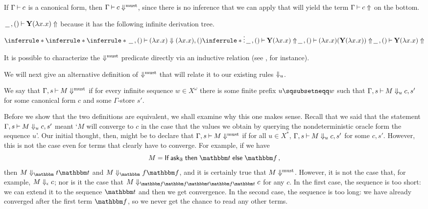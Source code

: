 \begin{example}
  If $\Gamma\mathbin{\vdash} c$ is a canonical form, then $\Gamma\mathbin{\vdash} c\Downarrow^{\text{must}}$, since there is no inference that we can apply that will yield the term $\Gamma\mathbin{\vdash} c\Uparrow$ on the bottom.
\end{example}

\begin{example}
  $\,\underline{\hspace{1.5ex}}\,,()\mathbin{\vdash} \mathbf{Y}(\lambda x.x)\Uparrow$ because it has the following infinite derivation tree.
  \[
    \inferrule*
    {
      \inferrule*
      {
        \inferrule*
        {
        }
        {
          \blank,()\ts (\lambda x.x) \converges (\lambda x.x),()
        }
        \\
        \inferrule*
        {
          \vdots
        }
        {
          \blank,() \ts \Y(\lambda x.x)\diverges
        }
      }
      {
        \blank,()\ts (\lambda x.x)(\Y(\lambda x.x)) \diverges
      }
    }
    {
      \blank,()\ts \Y(\lambda x.x)\diverges
    }
    \]
\end{example}

\begin{remark}
It is possible to characterize the $\Downarrow^{\text{must}}$ predicate directly via an inductive relation (see \cite{RusssThesis}, for instance).  
\end{remark}

We will next give an alternative definition of $\Downarrow^{\text{must}}$ that will relate it to our existing rules $\Downarrow_u$.

\begin{definition}
  We say that $\Gamma,s\mathbin{\vdash} M\Downarrow^{\text{must}}$ if for every infinite sequence $w\in X^\omega$ there is some finite prefix $u\pprefix w$ such that $\Gamma,s\mathbin{\vdash} M\Downarrow_u c,s'$ for some canonical form $c$ and some $\Gamma$-store $s'$.
  \label{DefMustConvergence}
\end{definition}

Before we show that the two definitions are equivalent, we shall examine why this one makes sense.  
Recall that we said that the statement $\Gamma,s\mathbin{\vdash} M\Downarrow_u c,s'$ meant `$M$ will converge to $c$ in the case that the values we obtain by querying the nondeterministic oracle form the sequence $u$'.  
Our initial thought, then, might be to declare that $\Gamma,s\mathbin{\vdash} M\Downarrow^{\text{must}}$ if for all $u\in X^*$, $\Gamma,s\mathbin{\vdash} M\Downarrow_u c,s'$ for some $c,s'$.  
However, this is not the case even for terms that clearly have to converge.
For example, if we have
\[
  M = \If \ask_\bB \Then \true \Else \false\,,
  \]
then $M\converges_\true \true$ and $M\converges_\false \false$, and it is certainly true that $M\Downarrow^{\text{must}}$.
However, it is not the case that, for example, $M\Downarrow_\epsilon c$; nor is it the case that $M\converges_{\false\false\true\false\true}c$ for any $c$.
In the first case, the sequence is too short: we can extend it to the sequence $\true$ and then we get convergence.  
In the second case, the sequence is too long: we have already converged after the first term $\false$, so we never get the chance to read any other terms.


